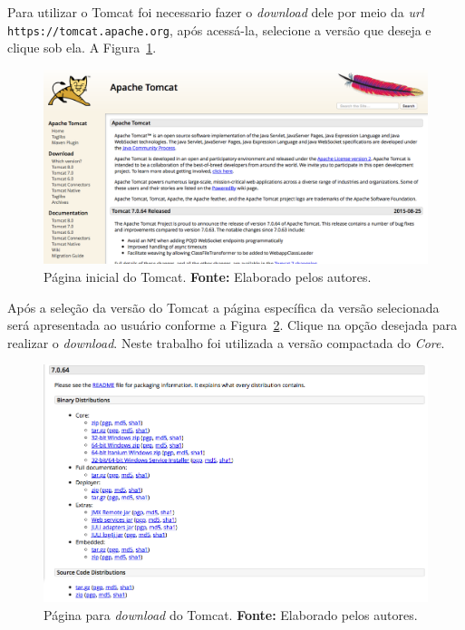 Para utilizar o Tomcat foi necessario fazer o \textit{download} dele por meio da \textit{url} \\ \texttt{https://tomcat.apache.org}, após acessá-la, selecione a versão que deseja e clique sob ela. A Figura~\ref{fig:ap2:pagina_inicial_apache_tomcat}.

\newpage
\captionsetup[figure]{list=no}
\begin{figure}[h!]
	\centerline{\includegraphics[scale=0.35]{./imagens/apendices/pagina-inicial-apache-tomcat.png}}
	\caption[Página inicial do Tomcat.]
	{Página inicial do Tomcat. \textbf{Fonte:} Elaborado pelos autores.}
	\label{fig:ap2:pagina_inicial_apache_tomcat}
\end{figure}

Após a seleção da versão do Tomcat a página específica da versão selecionada será apresentada ao usuário conforme a Figura~\ref{fig:ap2:pagina_download_apache_tomcat}. Clique na opção desejada para realizar o \textit{download}. Neste trabalho foi utilizada a versão compactada do \textit{Core}.

\captionsetup[figure]{list=no}
\begin{figure}[h!]
	\centerline{\includegraphics[scale=0.4]{./imagens/apendices/pagina-download-tomcat-7.png}}
	\caption[Página para \textit{download} do Tomcat.]
	{Página para \textit{download} do Tomcat. \textbf{Fonte:} Elaborado pelos autores.}
	\label{fig:ap2:pagina_download_apache_tomcat}
\end{figure}

